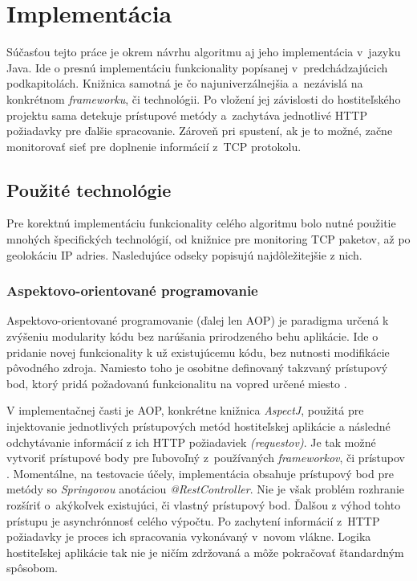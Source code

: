 \documentclass[
  digital, %
  oneside, %
  table,   %
  lof,     %
  nolot,   %
  nocover
]{fithesis3}
\begin{document}
\section{Implementácia}
Súčasťou tejto práce je okrem návrhu algoritmu aj jeho implementácia v~jazyku
Java. Ide o presnú implementáciu funkcionality popísanej v~predchádzajúcich
podkapitolách. Knižnica samotná je čo najuniverzálnejšia a~nezávislá na
konkrétnom \textit{frameworku}, či technológii. Po vložení jej závislosti do
hostiteľského projektu sama detekuje prístupové metódy a~zachytáva jednotlivé
HTTP požiadavky pre ďalšie spracovanie. Zároveň pri spustení, ak je to možné,
začne monitorovať sieť pre doplnenie informácií z~TCP protokolu.

\subsection{Použité technológie}
Pre korektnú implementáciu funkcionality celého algoritmu bolo nutné použitie
mnohých špecifických technológií, od knižnice pre monitoring TCP paketov, až po
geolokáciu IP adries. Nasledujúce odseky popisujú najdôležitejšie z nich.

\subsubsection{\bf{Aspektovo-orientované programovanie}}
Aspektovo-orientované programovanie (ďalej len AOP) je paradigma určená k
zvýšeniu modularity kódu bez narúšania prirodzeného behu aplikácie. Ide o 
pridanie novej funkcionality k už existujúcemu kódu, bez nutnosti modifikácie
pôvodného zdroja. Namiesto toho je osobitne definovaný takzvaný prístupový bod,
ktorý pridá požadovanú funkcionalitu na vopred určené miesto \cite{Kiczales:1997:AOP}.

V implementačnej časti je AOP, konkrétne knižnica \textit{AspectJ}, použitá pre
injektovanie jednotlivých prístupových metód hostiteľskej aplikácie a následné
odchytávanie informácií z ich HTTP požiadaviek \textit{(requestov)}. Je tak možné vytvoriť prístupové
body pre ľubovoľný z~používaných \textit{frameworkov}, či prístupov \cite{Laddad:2009:AOP}. Momentálne, na
testovacie účely, implementácia obsahuje prístupový bod pre metódy so
\textit{Springovou} anotáciou \textit{@RestController}. Nie je však problém
rozhranie rozšíriť o~akýkoľvek existujúci, či vlastný prístupový bod. Ďalšou z 
výhod tohto prístupu je asynchrónnosť celého výpočtu. Po zachytení informácií
z~HTTP požiadavky je proces ich spracovania vykonávaný v~novom vlákne. Logika
hostiteľskej aplikácie tak nie je ničím zdržovaná a môže pokračovať štandardným
spôsobom.
\end{document}
